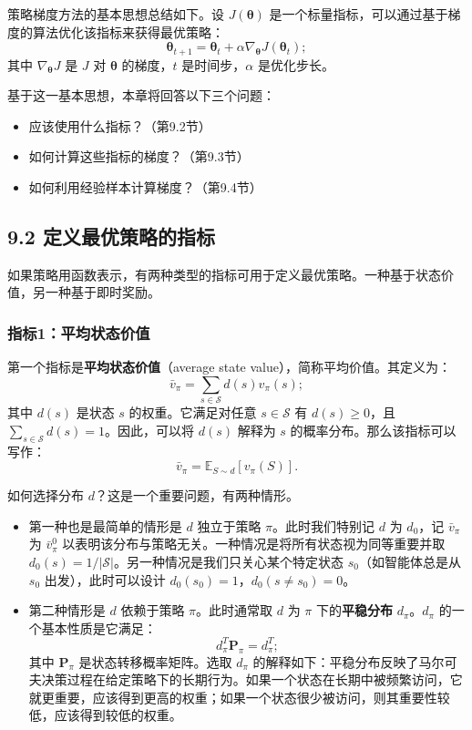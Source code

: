 \documentclass[UTF8]{article}
\begin{document}
策略梯度方法的基本思想总结如下。设 $J(\boldsymbol{\theta})$ 是一个标量指标，可以通过基于梯度的算法优化该指标来获得最优策略：
\[
\boldsymbol{\theta}_{t+1} = \boldsymbol{\theta}_t + \alpha \nabla_{\boldsymbol{\theta}} J(\boldsymbol{\theta}_t);
\]
其中 $\nabla_{\boldsymbol{\theta}} J$ 是 $J$ 对 $\boldsymbol{\theta}$ 的梯度，$t$ 是时间步，$\alpha$ 是优化步长。

基于这一基本思想，本章将回答以下三个问题：
\begin{itemize}
    \item 应该使用什么指标？（第9.2节）
    \item 如何计算这些指标的梯度？（第9.3节）
    \item 如何利用经验样本计算梯度？（第9.4节）
\end{itemize}

\subsection*{9.2 定义最优策略的指标}

如果策略用函数表示，有两种类型的指标可用于定义最优策略。一种基于状态价值，另一种基于即时奖励。

\subsubsection*{指标1：平均状态价值}

第一个指标是\textbf{平均状态价值}（average state value），简称平均价值。其定义为：
\[
\bar{v}_\pi = \sum_{s \in \mathcal{S}} d(s) v_\pi(s);
\]
其中 $d(s)$ 是状态 $s$ 的权重。它满足对任意 $s \in \mathcal{S}$ 有 $d(s) \geq 0$，且 $\sum_{s \in \mathcal{S}} d(s) = 1$。因此，可以将 $d(s)$ 解释为 $s$ 的概率分布。那么该指标可以写作：
\[
\bar{v}_\pi = \mathbb{E}_{S \sim d}[v_\pi(S)].
\]

如何选择分布 $d$？这是一个重要问题，有两种情形。

\begin{itemize}
    \item 第一种也是最简单的情形是 $d$ 独立于策略 $\pi$。此时我们特别记 $d$ 为 $d_0$，记 $\bar{v}_\pi$ 为 $\bar{v}_\pi^0$ 以表明该分布与策略无关。一种情况是将所有状态视为同等重要并取 $d_0(s) = 1/|\mathcal{S}|$。另一种情况是我们只关心某个特定状态 $s_0$（如智能体总是从 $s_0$ 出发），此时可以设计 $d_0(s_0) = 1$，$d_0(s \neq s_0) = 0$。
    \item 第二种情形是 $d$ 依赖于策略 $\pi$。此时通常取 $d$ 为 $\pi$ 下的\textbf{平稳分布} $d_\pi$。$d_\pi$ 的一个基本性质是它满足：
    \[
    d_\pi^T \boldsymbol{P}_\pi = d_\pi^T;
    \]
    其中 $\boldsymbol{P}_\pi$ 是状态转移概率矩阵。选取 $d_\pi$ 的解释如下：平稳分布反映了马尔可夫决策过程在给定策略下的长期行为。如果一个状态在长期中被频繁访问，它就更重要，应该得到更高的权重；如果一个状态很少被访问，则其重要性较低，应该得到较低的权重。
\end{itemize}
\end{document}
